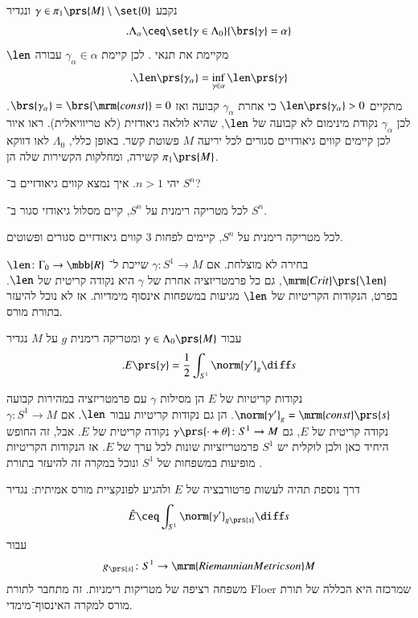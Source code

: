 \documentclass[a4paper,10pt,twoside,openany]{book}
\begin{document}
נקבע
$\gamma \in \pi_1\prs{M} \setminus \set{0}$
ונגדיר
\[\text{.} \Lambda_\alpha \ceq \set{\gamma \in \Lambda_0}{\brs{\gamma} = \alpha}\]
$\len$
מקיימת את תנאי
.
לכן קיימת
$\gamma_\alpha \in \alpha$
עבורה
\[\text{.} \len\prs{\gamma_\alpha} = \inf_{\gamma \in \alpha} \len\prs{\gamma}\]
מתקיים
$\len\prs{\gamma_\alpha} > 0$
כי אחרת 
$\gamma_\alpha$
קבועה ואז
$\brs{\gamma_\alpha} = \brs{\mrm{const}} = 0$.
לכן
$\gamma_\alpha$
נקודת מינימום לא קבועה של
$\len$,
שהיא לולאה גיאודזית (לא טריוויאלית).
ראו איור
לכן קיימים קווים גיאודזיים סגורים לכל יריעה
$M$
פשוטת קשר.
באופן כללי,
$\Lambda_0$
לאו דווקא קשירה, ומחלקות הקשירות שלה הן
$\pi_1\prs{M}$.

\begin{question}
יהי
$n > 1$.
איך נמצא קווים גיאודזיים ב־%
$S^n$?
\end{question}

\begin{theorem}
לכל מטריקה רימנית על
$S^n$,
קיים מסלול גיאודזי סגור ב־%
$S^n$.
\end{theorem}

\begin{theorem}
לכל מטריקה רימנית על
$S^n$,
קיימים לפחות
$3$
קווים גיאודזיים סגורים ופשוטים.
\end{theorem}

\begin{remark}
$\len \colon \Gamma_0 \to \mbb{R}$
בחירה לא מוצלחת.
אם
$\gamma \colon S^1 \to M$
שייכת ל־%
$\mrm{Crit}\prs{\len}$,
גם כל פרמטריזציה אחרת של
$\gamma$
היא נקודה קריטית של
$\len$.
בפרט, הנקודות הקריטיות של
$\len$
מגיעות במשפחות אינסוף מימדיות. אז לא נוכל להיעזר בתורת מורס.
\end{remark}

\begin{definition}
עבור
$\gamma \in \Lambda_0\prs{M}$
ומטריקה רימנית
$g$
על
$M$
נגדיר
\[\text{.} E\prs{\gamma} = \frac{1}{2} \int_{S^1} \norm{\gamma'}_g \diff s\]
\end{definition}

\begin{remark}
נקודות קריטיות של
$E$
הן מסילות
$\gamma$
עם פרמטריזציה במהירות קבועה
$\norm{\gamma'}_g = \mrm{const}\prs{s}$.
הן גם נקודות קריטיות עבור
$\len$.
אם
$\gamma \colon S^1 \to M$
נקודה קריטית של
$E$,
גם
$\gamma\prs{\cdot + \theta} \colon S^1 \to M$
נקודה קריטית של
$E$.
אבל, זה החופש היחיד כאן ולכן לוקלית יש
$S^1$
פרמטריזציות שונות לכל ערך של
$E$.
אז הנקודות הקריטיות מופיעות במשפחות של
$S^1$
ונוכל במקרה זה להיעזר בתורת
.

דרך נוספת תהיה לעשות פרטורבציה של
$E$
ולהגיע לפונקציית מורס אמיתית:
נגדיר
\begin{align*}
\hat{E} \ceq \int_{S^1} \norm{\gamma'}_{g\prs{s}} \diff s
\end{align*}
עבור
\[g_{\prs{s}} \colon S^1 \to \mrm{Riemannian Metrics on } M\]
משפחה רציפה של מטריקות רימניות.
זה מתחבר לתורת
\textenglish{Floer}
שמרכזה היא הכללה של תורת מורס למקרה האינסוף־מימדי.
\end{remark}
\end{document}
